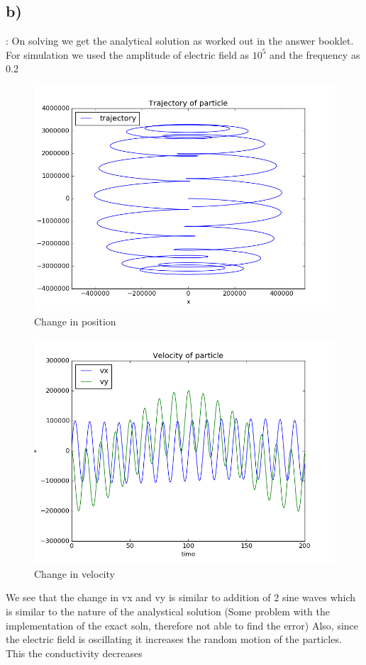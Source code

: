\documentclass[11pt, a4paper]{article}
\begin{document}
\subsection{b)}:
On solving we get the analytical solution as worked out in the answer booklet. For simulation we used the amplitude of electric field as $10^5$
and the frequency as 0.2
\begin{figure}[H]
 \centering
 \includegraphics[scale = 0.6]{ques2b_pos.png}
 \caption{Change in position}
\end{figure}

\begin{figure}[H]
 \centering
 \includegraphics[scale = 0.6]{ques2b_vel.png}
 \caption{Change in velocity}
\end{figure}
We see that the change in vx and vy is similar to addition of 2 sine waves which is similar to the nature of the analystical solution
(Some problem with the implementation of the exact soln, therefore not able to find the error)
Also, since the electric field is oscillating it increases the random motion of the particles. This the conductivity decreases
\end{document}
